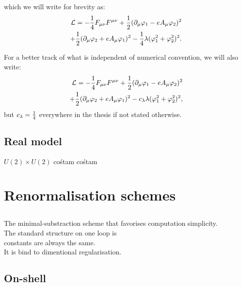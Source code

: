 which we will write for brevity as:
\begin{align}
\mathcal{L} = -\frac{1}{4}F_{\mu\nu}F^{\mu\nu}+ 
\frac{1}{2}(\partial_\mu\varphi_1 - eA_\mu\varphi_2)^2\\
+\frac{1}{2}(\partial_\mu\varphi_2+eA_\mu\varphi_1)^2
-\frac{1}{4}\lambda(\varphi_1^2+\varphi_2^2)^2. \notag
\end{align}


For a better track of what is independent of numerical convention, we will also write:
\begin{align}\label{scalar_electrodynamics}
\mathcal{L} = -\frac{1}{4}F_{\mu\nu}F^{\mu\nu}+ 
\frac{1}{2}(\partial_\mu\varphi_1 - eA_\mu\varphi_2)^2\\
+\frac{1}{2}(\partial_\mu\varphi_2+eA_\mu\varphi_1)^2
-c_\lambda\lambda(\varphi_1^2+\varphi_2^2)^2, \notag
\end{align}
but $c_\lambda = \frac{1}{4}$ everywhere in the thesis if not stated otherwise.
\subsection{Real model}
$U(2)\times U(2)$ cośtam cośtam

\section{Renormalisation schemes}
\subsection{\MSbar}
The minimal-substraction scheme that favorises computation simplicity. \\
The standard structure on one loop is \\
constants are always the same. \\
It is bind to dimentional regularisation.
\subsection{On-shell}
